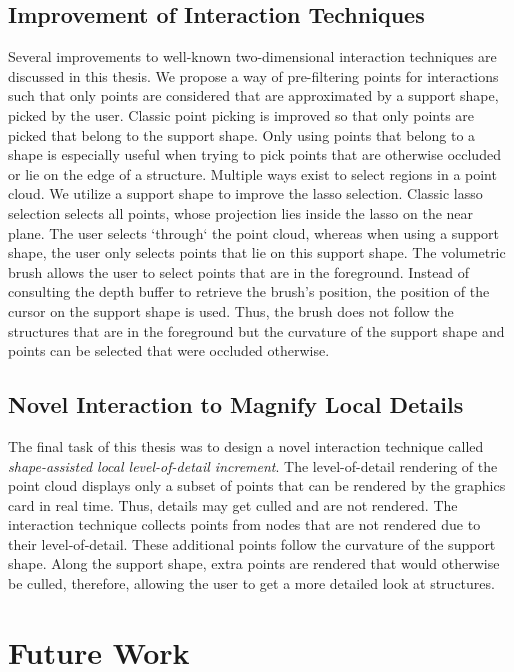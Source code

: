 \subsection*{Improvement of Interaction Techniques}

Several improvements to well-known two-dimensional interaction techniques are discussed in this thesis. We propose a way of pre-filtering points for interactions such that only points are considered that are approximated by a support shape, picked by the user. Classic point picking is improved so that only points are picked that belong to the support shape. Only using points that belong to a shape is especially useful when trying to pick points that are otherwise occluded or lie on the edge of a structure. Multiple ways exist to select regions in a point cloud. We utilize a support shape to improve the lasso selection. Classic lasso selection selects all points, whose projection lies inside the lasso on the near plane. The user selects `through` the point cloud, whereas when using a support shape, the user only selects points that lie on this support shape. The volumetric brush allows the user to select points that are in the foreground. Instead of consulting the depth buffer to retrieve the brush's position, the position of the cursor on the support shape is used. Thus, the brush does not follow the structures that are in the foreground but the curvature of the support shape and points can be selected that were occluded otherwise. 


\subsection*{Novel Interaction to Magnify Local Details}

The final task of this thesis was to design a novel interaction technique called \textit{shape-assisted local level-of-detail increment}. The level-of-detail rendering of the point cloud displays only a subset of points that can be rendered by the graphics card in real time. Thus, details may get culled and are not rendered. The interaction technique collects points from nodes that are not rendered due to their level-of-detail. These additional points follow the curvature of the support shape. Along the support shape, extra points are rendered that would otherwise be culled, therefore, allowing the user to get a more detailed look at structures. 


\section{Future Work}


